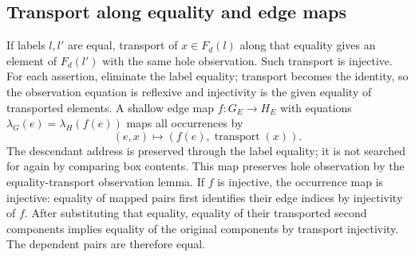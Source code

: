 \subsection{Transport along equality and edge maps}
If labels $l,l'$ are equal, transport of $x\in F_d(l)$ along that equality gives
an element of $F_d(l')$ with the same hole observation. Such transport is injective.
For each assertion, eliminate the label equality; transport becomes the identity,
so the observation equation is reflexive and injectivity is the given equality
of transported elements.
A shallow edge map $f:G_E\to H_E$ with equations
$\lambda_G(e)=\lambda_H(f(e))$ maps all occurrences by
\[
 (e,x)\longmapsto (f(e),\operatorname{transport}(x)).
\]
The descendant address is preserved through the label equality; it is not
searched for again by comparing box contents.
This map preserves hole observation by the equality-transport observation lemma.
If $f$ is injective, the occurrence map is injective: equality of mapped pairs
first identifies their edge indices by injectivity of $f$. After substituting
that equality, equality of their transported second components implies equality
of the original components by transport injectivity. The dependent pairs are
therefore equal.
